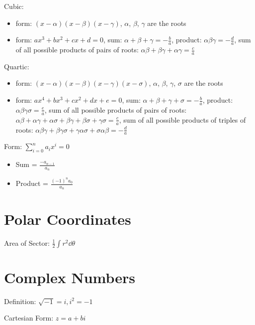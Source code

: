 \documentclass[10pt,a4paper,oneside]{book}
\begin{document}
Cubic:
\begin{itemize}
    \item form: $(x-\alpha)(x-\beta)(x-\gamma)$, $\alpha$, $\beta$, $\gamma$ are the roots 
    \item form: $ax^3+bx^2+cx+d=0$, sum: $\alpha+\beta+\gamma=-\frac{b}{a}$, product: $\alpha\beta\gamma = -\frac{d}{a}$, sum of all possible products of pairs of roots: $\alpha\beta + \beta\gamma + \alpha\gamma = \frac{c}{a}$
\end{itemize}

Quartic:
\begin{itemize}
    \item form: $(x-\alpha)(x-\beta)(x-\gamma)(x-\sigma)$, $\alpha$, $\beta$, $\gamma$, $\sigma$ are the roots 
    \item form: $ax^4+bx^3+cx^2+dx+e=0$, sum: $\alpha+\beta+\gamma+\sigma = -\frac{b}{a}$, product: $\alpha\beta\gamma\sigma = \frac{e}{a}$, sum of all possible products of pairs of roots: $\alpha\beta + \alpha\gamma + \alpha\sigma + \beta\gamma + \beta\sigma + \gamma\sigma = \frac{c}{a}$, sum of all possible products of triples of roots: $\alpha\beta\gamma + \beta\gamma\sigma + \gamma\alpha\sigma + \sigma\alpha\beta = -\frac{d}{a}$
\end{itemize}

Form: $\sum^n_{i=0}a_ix^i=0$
\begin{itemize}
    \item Sum = $\frac{-a_{n-1}}{a_n}$
    \item Product = $\frac{(-1)^na_0}{a_n}$
\end{itemize}

\section*{Polar Coordinates}
Area of Sector: $\frac{1}{2}\int r^2\dd \theta$

\section*{Complex Numbers}
Definition: $\sqrt{-1}=i, i^2=-1$

Cartesian Form: $z=a+bi$
\end{document}
